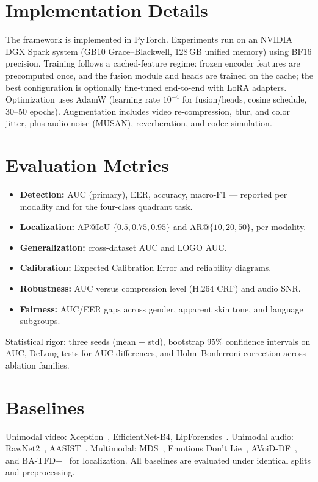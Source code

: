 \section{Implementation Details}
The framework is implemented in PyTorch. Experiments run on an NVIDIA DGX Spark
system (GB10 Grace--Blackwell, 128\,GB unified memory) using BF16 precision.
Training follows a cached-feature regime: frozen encoder features are precomputed
once, and the fusion module and heads are trained on the cache; the best
configuration is optionally fine-tuned end-to-end with LoRA adapters.
Optimization uses AdamW (learning rate $10^{-4}$ for fusion/heads, cosine
schedule, 30--50 epochs). Augmentation includes video re-compression, blur, and
color jitter, plus audio noise (MUSAN), reverberation, and codec simulation.

\section{Evaluation Metrics}
\begin{itemize}
  \item \textbf{Detection:} AUC (primary), EER, accuracy, macro-F1 --- reported
        per modality and for the four-class quadrant task.
  \item \textbf{Localization:} AP@IoU $\{0.5, 0.75, 0.95\}$ and AR@$\{10,20,50\}$,
        per modality.
  \item \textbf{Generalization:} cross-dataset AUC and LOGO AUC.
  \item \textbf{Calibration:} Expected Calibration Error and reliability diagrams.
  \item \textbf{Robustness:} AUC versus compression level (H.264 CRF) and
        audio SNR.
  \item \textbf{Fairness:} AUC/EER gaps across gender, apparent skin tone, and
        language subgroups.
\end{itemize}
Statistical rigor: three seeds (mean $\pm$ std), bootstrap 95\% confidence
intervals on AUC, DeLong tests for AUC differences, and Holm--Bonferroni
correction across ablation families.

\section{Baselines}
Unimodal video: Xception~\cite{rossler2019faceforensics}, EfficientNet-B4,
LipForensics~\cite{haliassos2021lipforensics}. Unimodal audio:
RawNet2~\cite{tak2021rawnet2}, AASIST~\cite{jung2022aasist}. Multimodal:
MDS~\cite{chugh2020mds}, Emotions Don't Lie~\cite{mittal2020emotions},
AVoiD-DF~\cite{yang2023avoiddf}, and BA-TFD+~\cite{cai2022lavdf} for
localization. All baselines are evaluated under identical splits and
preprocessing.
